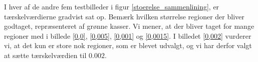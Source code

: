 {I hver af de andre fem testbilleder i figur \ref{stoerelse_sammenlining}, er
tærskelværdierne gradvist sat op. Bemærk hvilken størrelse regioner der bliver
godtaget, repræsenteret af grønne kasser. Vi mener, at der bliver taget for
mange regioner med i billede \ref{0,0}, \ref{0,005}, \ref{0,001} og
\ref{0,0015}. I billedet \ref{0,002} vurderer vi, at det kun er store nok
regioner, som er blevet udvalgt, og vi har derfor valgt at sætte tærskelværdien
til $0.002$.

\begin{figure}[!h]
    \setlength\fboxsep{0pt}
    \setlength\fboxrule{0.5pt}
    \centering
    \\
\end{figure}}
